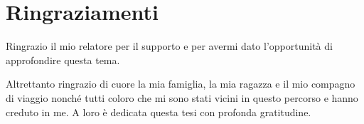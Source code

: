 \chapter*{Ringraziamenti}
Ringrazio il mio relatore per il supporto e per avermi dato l'opportunità di approfondire questa tema.

Altrettanto ringrazio di cuore la mia famiglia, la mia ragazza e il mio compagno di viaggio nonché tutti coloro che mi sono
stati vicini in questo percorso e hanno creduto in me. A loro è dedicata questa tesi con profonda gratitudine.
